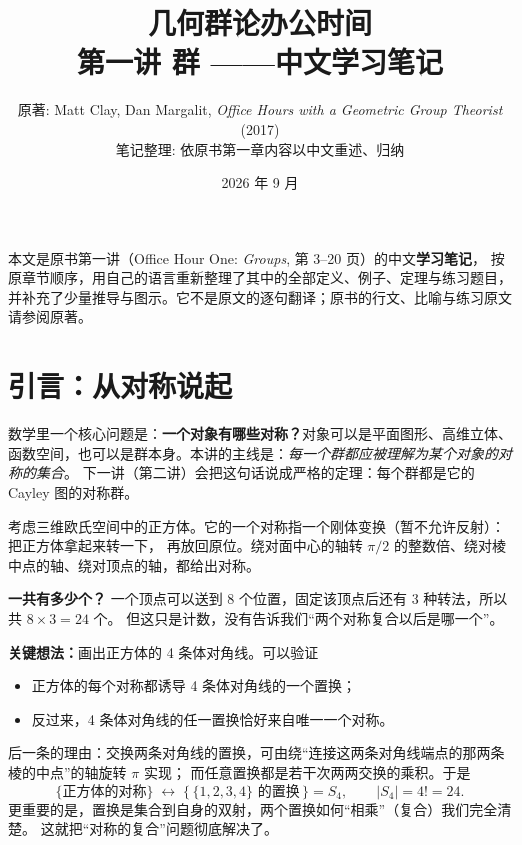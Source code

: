 \documentclass[11pt,a4paper]{article}
\title{\sffamily\bfseries 几何群论办公时间 \\ \large 第一讲 \; 群 \quad ——中文学习笔记}
\author{原著: Matt Clay, Dan Margalit, \emph{Office Hours with a Geometric Group Theorist} (2017)\\
  笔记整理: 依原书第一章内容以中文重述、归纳}
\date{2026 年 9 月}
\theoremstyle{definition}
\theoremstyle{plain}
\theoremstyle{remark}
\begin{document}
\maketitle

\begin{summarybox}[关于本笔记]
本文是原书第一讲（Office Hour One: \emph{Groups}, 第 3--20 页）的中文\textbf{学习笔记}，
按原章节顺序，用自己的语言重新整理了其中的全部定义、例子、定理与练习题目，
并补充了少量推导与图示。它不是原文的逐句翻译；原书的行文、比喻与练习原文请参阅原著。
\end{summarybox}

\tableofcontents

\section*{引言：从对称说起}

数学里一个核心问题是：\textbf{一个对象有哪些对称？}对象可以是平面图形、高维立体、
函数空间，也可以是群本身。本讲的主线是：\emph{每一个群都应被理解为某个对象的对称的集合}。
下一讲（第二讲）会把这句话说成严格的定理：每个群都是它的 Cayley 图的对称群。

\begin{keyidea}
考虑三维欧氏空间中的正方体。它的一个对称指一个刚体变换（暂不允许反射）：把正方体拿起来转一下，
再放回原位。绕对面中心的轴转 $\pi/2$ 的整数倍、绕对棱中点的轴、绕对顶点的轴，都给出对称。

\textbf{一共有多少个？} 一个顶点可以送到 8 个位置，固定该顶点后还有 3 种转法，所以共 $8\times 3=24$ 个。
但这只是计数，没有告诉我们“两个对称复合以后是哪一个”。

\textbf{关键想法：}画出正方体的 4 条体对角线。可以验证
\begin{itemize}[nosep]
  \item 正方体的每个对称都诱导 4 条体对角线的一个置换；
  \item 反过来，4 条体对角线的任一置换恰好来自唯一一个对称。
\end{itemize}
后一条的理由：交换两条对角线的置换，可由绕“连接这两条对角线端点的那两条棱的中点”的轴旋转 $\pi$ 实现；
而任意置换都是若干次两两交换的乘积。于是
\[
  \{\text{正方体的对称}\} \;\longleftrightarrow\; \{\,\{1,2,3,4\}\text{ 的置换}\,\} = S_4,
  \qquad |S_4| = 4! = 24 .
\]
更重要的是，置换是集合到自身的双射，两个置换如何“相乘”（复合）我们完全清楚。
这就把“对称的复合”问题彻底解决了。
\end{keyidea}
\end{document}
